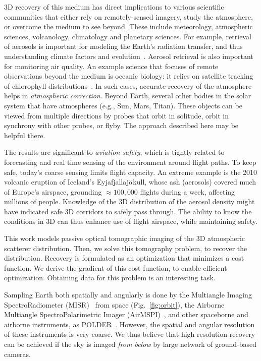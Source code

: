 \documentclass[10pt,twocolumn,letterpaper]{article}
\begin{document}
3D recovery of this medium has direct implications to various scientific communities that either rely on remotely-sensed imagery, study the atmosphere, or overcome the medium to see beyond. These include meteorology, atmospheric sciences, volcanology, climatology and planetary sciences. For example, retrieval of aerosols %
is important for modeling the Earth's radiation transfer, and thus understanding climate factors and evolution~\cite{chud,dayan,kalashnikova}. Aerosol retrieval is also important for monitoring air quality. An example science that focuses of remote observations beyond the medium is oceanic biology: it relies on satellite tracking of chlorophyll distributions~\cite{chang,johnsen,levy,moses}. In such cases, accurate recovery of the atmosphere helps in {\em atmospheric correction}. Beyond Earth, several other bodies in the solar system that have atmospheres (e.g., Sun, Mars, Titan). These objects can be viewed from multiple directions by probes that orbit in solitude, orbit in synchrony with other probes, or flyby. The approach described here may be helpful there.

The results are significant to {\em aviation safety}, which is tightly related to forecasting and real time sensing of the environment around flight
paths. To keep safe, today's coarse sensing limits flight capacity. An extreme example is the 2010 volcanic eruption of Iceland's
Eyjafjallaj$\ddot {\rm o}$kull, whose ash (aerosols) covered much of Europe's airspace, grounding $\approx 100,000$ flights during a week, affecting millions of people. Knowledge of the 3D distribution of the aerosol density might have indicated safe 3D corridors to safely pass through.
The ability to know the conditions in 3D can thus enhance use of flight airspace, while maintaining safety.


This work models passive optical tomographic imaging of the 3D atmospheric scatterer distribution. Then, we solve this tomography problem, to recover the distribution. Recovery is formulated as an optimization that minimizes a cost function. We derive the gradient of this cost function, to enable efficient optimization. Obtaining data for this problem is an interesting task.

Sampling Earth both spatially and angularly is done by the Multiangle Imaging SpectroRadiometer (MISR)~\cite{diner,matronchik} from space (Fig.~\ref{fig:orbit}), the Airborne Multiangle SpectroPolarimetric Imager (AirMSPI)~\cite{dinerDavis07,dinerDavis10}, and other spaceborne and airborne instruments, as POLDER~\cite{baxter,breon,vanMol}. However, the spatial and angular resolution of these instruments is very coarse. We thus believe that high resolution recovery can be achieved if the sky is imaged {\em from below} by large network of ground-based cameras.
\end{document}
